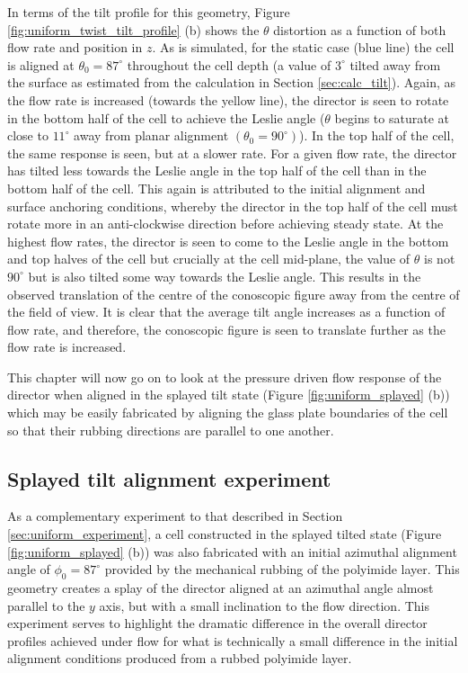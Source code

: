 In terms of the tilt profile for this geometry, Figure \ref{fig:uniform_twist_tilt_profile} (b) shows the $\theta$ distortion as a function of both flow rate and position in $z$. As is simulated, for the static case (blue line) the cell is aligned at $\theta_0=87^{\circ}$ throughout the cell depth (a value of $3^{\circ}$ tilted away from the surface as estimated from the calculation in Section \ref{sec:calc_tilt}). Again, as the flow rate is increased (towards the yellow line), the director is seen to rotate in the bottom half of the cell to achieve the Leslie angle ($\theta$ begins to saturate at close to $11^{\circ}$ away from planar alignment $\left(\theta_0=90^{\circ}\right)$). In the top half of the cell, the same response is seen, but at a slower rate. For a given flow rate, the director has tilted less towards the Leslie angle in the top half of the cell than in the bottom half of the cell. This again is attributed to the initial alignment and surface anchoring conditions, whereby the director in the top half of the cell must rotate more in an anti-clockwise direction before achieving steady state. At the highest flow rates, the director is seen to come to the Leslie angle in the bottom and top halves of the cell but crucially at the cell mid-plane, the value of $\theta$ is not $90^{\circ}$ but is also tilted some way towards the Leslie angle. This results in the observed translation of the centre of the conoscopic figure away from the centre of the field of view. It is clear that the average tilt angle increases as a function of flow rate, and therefore, the conoscopic figure is seen to translate further as the flow rate is increased.

This chapter will now go on to look at the pressure driven flow response of the director when aligned in the splayed tilt state (Figure \ref{fig:uniform_splayed} (b)) which may be easily fabricated by aligning the glass plate boundaries of the cell so that their rubbing directions are parallel to one another.

\subsection{Splayed tilt alignment experiment}
\label{sec:splayed}
As a complementary experiment to that described in Section \ref{sec:uniform_experiment}, a cell constructed in the splayed tilted state (Figure \ref{fig:uniform_splayed} (b)) was also fabricated with an initial azimuthal alignment angle of $\phi_0=87^{\circ}$ provided by the mechanical rubbing of the polyimide layer. This geometry creates a splay of the director aligned at an azimuthal angle almost parallel to the $y$ axis, but with a small inclination to the flow direction. This experiment serves to highlight the dramatic difference in the overall director profiles achieved under flow for what is technically a small difference in the initial alignment conditions produced from a rubbed polyimide layer.

